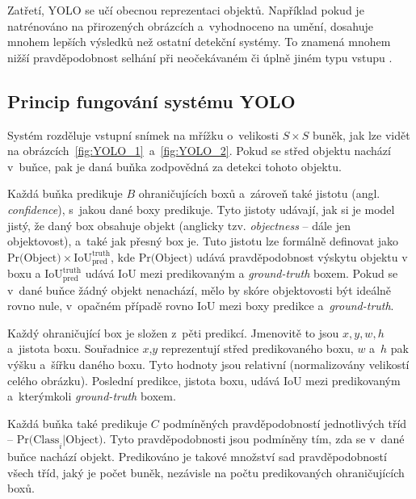 Zatřetí, YOLO se učí obecnou reprezentaci objektů. Například pokud je natrénováno na přirozených obrázcích a~vyhodnoceno na umění, dosahuje mnohem lepších výsledků než ostatní detekční systémy. To znamená mnohem nižší pravděpodobnost selhání při neočekávaném či úplně jiném typu vstupu \cite{yolov1}.


\subsection*{Princip fungování systému YOLO}
Systém rozděluje vstupní snímek na mřížku o~velikosti $S \times S$ buněk, jak lze vidět na obrázcích~\ref{fig:YOLO_1}~a~\ref{fig:YOLO_2}. Pokud se střed objektu nachází v~buňce, pak je daná buňka zodpovědná za detekci tohoto objektu.

Každá buňka predikuje $B$ ohraničujících boxů a~zároveň také jistotu (angl. \emph{confidence}), s~jakou dané boxy predikuje. Tyto jistoty udávají, jak si je model jistý, že daný box obsahuje objekt (anglicky tzv. \emph{objectness} -- dále jen objektovost), a~také jak přesný box je. Tuto jistotu lze formálně definovat jako $\text{Pr(Object)} \times \text{IoU}_{\text{pred}}^\text{truth}$, kde $\text{Pr(Object)}$ udává pravděpodobnost výskytu objektu v boxu a $\text{IoU}_{\text{pred}}^\text{truth}$ udává IoU mezi predikovaným a \emph{ground-truth} boxem. Pokud se v~dané buňce žádný objekt nenachází, mělo by skóre objektovosti být ideálně rovno nule, v~opačném případě rovno IoU mezi boxy predikce a~\emph{ground-truth}.

Každý ohraničující box je složen z~pěti predikcí. Jmenovitě to jsou $x,y,w,h$ a~jistota boxu. Souřadnice $x$,$y$ reprezentují střed predikovaného boxu, $w$ a~$h$ pak výšku a~šířku daného boxu. Tyto hodnoty jsou relativní (normalizovány velikostí celého obrázku). Poslední predikce, jistota boxu, udává IoU mezi predikovaným a~kterýmkoli \emph{ground-truth} boxem.

Každá buňka také predikuje $C$ podmíněných pravděpodobností jednotlivých tříd -- $\text{Pr(Class}_{i}\text{|Object)}$. Tyto pravděpodobnosti jsou podmíněny tím, zda se v~dané buňce nachází objekt. Predikováno je takové množství sad pravděpodobností všech tříd, jaký je počet buněk, nezávisle na počtu predikovaných ohraničujících boxů.

